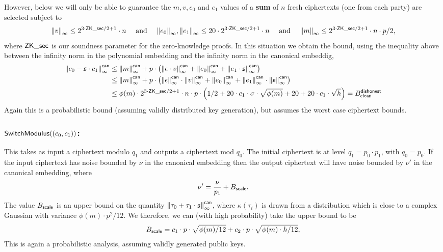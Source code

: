 \noindent
However, below we will only be able to guarantee the
$m, v, e_0$ and $e_1$ values of a {\bf sum} of $n$ fresh ciphertexts
(one from each party) are selected subject to
\[ {\Vert v \Vert}_\infty \le 2^{3 \cdot \mathsf{ZK\_sec}/2+1} \cdot n \quad 
    \mbox{  and  } \quad
   {\Vert e_0 \Vert}_\infty, {\Vert e_1 \Vert}_\infty \le 20 \cdot 2^{3 \cdot \mathsf{ZK\_sec}/2+1} \cdot n \quad
    \mbox{  and  } \quad
   {\Vert m \Vert}_\infty \le 2^{3 \cdot \mathsf{ZK\_sec}/2+1} \cdot n \cdot p/2,
\]
where $\mathsf{ZK\_sec}$ is our soundness parameter for the 
zero-knowledge proofs.
In this situation we obtain the bound, using the inequality above
between the infinity norm in the polynomial embedding
and the infinity norm in the canonical embeddig,
\begin{align*}
 {\Vert c_0 - \mathfrak{s}\cdot c_1 \Vert}_\infty^{\mathsf{can}} 
   & \le  {\Vert m \Vert}_\infty^{\mathsf{can}} 
         +p \cdot \left( {\Vert \epsilon\cdot v \Vert}_\infty^{\mathsf{can}}
                       + {\Vert e_0 \Vert}_\infty^{\mathsf{can}}
                       + {\Vert e_1 \cdot \mathfrak{s} \Vert}_\infty^{\mathsf{can}}
                  \right) \\
   &\le  {\Vert m \Vert}_\infty^{\mathsf{can}} 
         +p \cdot \left( {\Vert \epsilon \Vert}_\infty^{\mathsf{can}} \cdot {\Vert  v \Vert}_\infty^{\mathsf{can}}
                       + {\Vert e_0 \Vert}_\infty^{\mathsf{can}}
                       + {\Vert e_1 \Vert}_\infty^{\mathsf{can}} \cdot {\Vert  \mathfrak{s}\Vert}_\infty^{\mathsf{can}}
                  \right)  \\
   &\le \phi(m) \cdot 2^{3 \cdot \mathsf{ZK\_sec}/2+1} \cdot  n  \cdot p \cdot
	\left( 1/2 + 20 \cdot c_1 \cdot \sigma \cdot \sqrt{\phi(m)}
		   + 20 
		   + 20 \cdot c_1 \cdot \sqrt{h}
        \right) = B_{\mathsf{clean}}^{\mathsf{dishonest}}
\end{align*}
Again this is a probabilistic bound (assuming validly
distributed key generation), but assumes the worst case
ciphertext bounds.

\subsubsection{$\mathsf{SwitchModulus}((c_0,c_1))$:}
This takes as input a ciphertext modulo $q_1$ and outputs a ciphertext mod $q_0$.
The initial ciphertext is at level $q_1=p_0 \cdot p_1$, with $q_0=p_0$.
If the input ciphertext has noise bounded by $\nu$
in the canonical embedding
then the output ciphertext will have noise bounded by $\nu'$ in
the canonical embedding, where
\[ \nu' = \frac{\nu}{p_1} + B_{\mathsf{scale}}. \]
The value $B_{\mathsf{scale}}$ is an upper bound on the quantity
${\Vert \tau_0+\tau_1 \cdot \mathfrak{s} \Vert}_\infty^{\mathsf{can}}$, where
$\kappa(\tau_i)$ is drawn from a distribution
which is close to a complex Gaussian with variance $\phi(m)\cdot p^2/12$.
We therefore, we can (with high probability) take the upper
bound to be
\begin{align*}
    B_{\mathsf{scale}} 
	&= c_1 \cdot p \cdot \sqrt{ \phi(m)/12}
	+  c_2 \cdot p \cdot \sqrt{ \phi(m) \cdot h/12}, \\
\end{align*}
This is again a probabilistic analysis, assuming validly generated
public keys.

